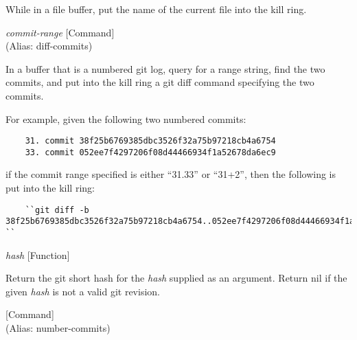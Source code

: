 \begin{doc-string}
While in a file buffer, put the name of the current file into the kill ring.
\end{doc-string}

\vspace{1em}
\noindent
{}
\usebox{\funcname}\emph{commit-range}
 \hfill [Command]\\%
 (Alias: diff-commits)

\begin{doc-string}
In a buffer that is a numbered git log, query for a range string, find the two
commits, and put into the kill ring a git diff command specifying the two commits.

For example, given the following two numbered commits:

\small{\begin{verbatim}
    31. commit 38f25b6769385dbc3526f32a75b97218cb4a6754
    33. commit 052ee7f4297206f08d44466934f1a52678da6ec9
\end{verbatim}}

if the commit range specified is either ``31.33'' or ``31+2'', then the following
is put into the kill ring:

\small{\begin{verbatim}
    ``git diff -b 38f25b6769385dbc3526f32a75b97218cb4a6754..052ee7f4297206f08d44466934f1a52678da6ec9 ``
\end{verbatim}}
\end{doc-string}

\vspace{1em}
\noindent
{}
\usebox{\funcname}\emph{hash}
 \hfill [Function]

\begin{doc-string}
Return the git short hash for the \emph{hash} supplied as an argument.  Return nil
if the given \emph{hash} is not a valid git revision.
\end{doc-string}

\vspace{1em}
\noindent
{}
\usebox{\funcname}
 \hfill [Command]\\%
 (Alias: number-commits)

